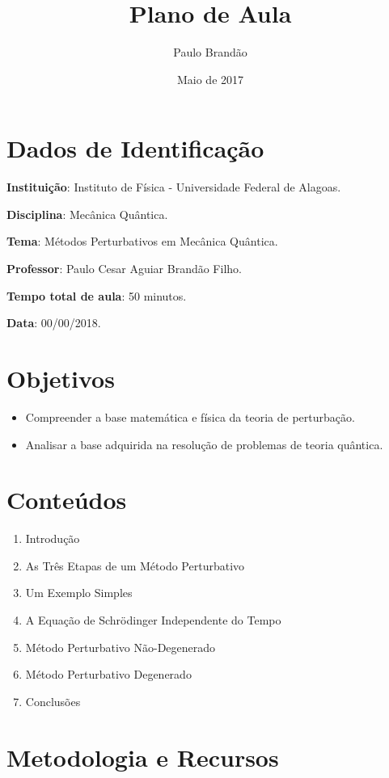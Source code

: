 \documentclass{article}
\title{\Huge\color{astral}\textbf{Plano de Aula}}
\author{Paulo Brandão}
\date{Maio de 2017}
\begin{document}
\maketitle

\section{Dados de Identificação}

\noindent \textbf{Instituição}: Instituto de Física - Universidade Federal de Alagoas.

\noindent \textbf{Disciplina}: Mecânica Quântica.

\noindent \textbf{Tema}: Métodos Perturbativos em Mecânica Quântica.

\noindent \textbf{Professor}: Paulo Cesar Aguiar Brandão Filho.

\noindent \textbf{Tempo total de aula}: 50 minutos.

\noindent \textbf{Data}: 00/00/2018.

\section{Objetivos}

\begin{itemize}
    \item Compreender a base matemática e física da teoria de perturbação.
    \item Analisar a base adquirida na resolução de problemas de teoria quântica.
\end{itemize}

\section{Conteúdos}

\begin{enumerate}
    \item Introdução
    \item As Três Etapas de um Método Perturbativo
    \item Um Exemplo Simples
    \item A Equação de Schrödinger Independente do Tempo
    \item Método Perturbativo Não-Degenerado
    \item Método Perturbativo Degenerado
    \item Conclusões
\end{enumerate}

\section{Metodologia e Recursos}
\end{document}
